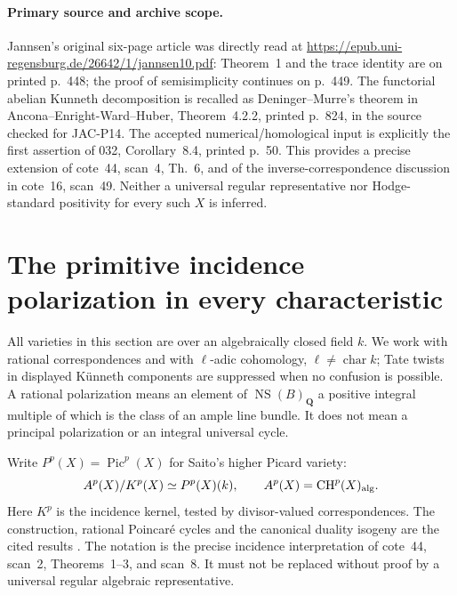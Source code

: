 \documentclass[11pt,a4paper]{article}
\begin{document}
\paragraph{Primary source and archive scope.}
Jannsen's original six-page article was directly read at
\url{https://epub.uni-regensburg.de/26642/1/jannsen10.pdf}:
Theorem~1 and the trace identity are on printed p.~448;
the proof of semisimplicity continues on p.~449.
The functorial abelian Kunneth decomposition is recalled as
Deninger--Murre's theorem in Ancona--Enright-Ward--Huber,
Theorem~4.2.2, printed p.~824, in the source checked for JAC-P14.
The accepted numerical/homological input is explicitly the first
assertion of 032, Corollary~8.4, printed p.~50.
This provides a precise extension of cote~44, scan~4, Th.~6,
and of the inverse-correspondence discussion in cote~16,
scan~49. Neither a universal regular representative nor
Hodge-standard positivity for every such $X$ is inferred.


\section{The primitive incidence polarization in every characteristic}
\label{sec:T4}

All varieties in this section are over an algebraically closed field $k$.
We work with rational correspondences and with $\ell$-adic cohomology,
$\ell\ne\operatorname{char}k$; Tate twists in displayed K\"unneth components
are suppressed when no confusion is possible. A rational polarization means
an element of $\operatorname{NS}(B)_{\mathbf Q}$ a positive integral multiple
of which is the class of an ample line bundle. It does not mean a principal
polarization or an integral universal cycle.

Write $P^p(X)=\operatorname{Pic}^p(X)$ for Saito's higher Picard variety:
\[
 A^p(X)/K^p(X)\simeq P^p(X)(k),\qquad
 A^p(X)=\operatorname{CH}^p(X)_{\rm alg}.
\]
Here $K^p$ is the incidence kernel, tested by divisor-valued
correspondences. The construction, rational Poincar\'e cycles and the
canonical duality isogeny are the cited results
\cite[Theorem~3.6, \S4.1, Proposition~4.4]{Saito1979}.
The notation is the precise incidence interpretation of cote~44,
scan~2, Theorems~1--3, and scan~8. It must not be replaced without proof
by a universal regular algebraic representative.
\end{document}
